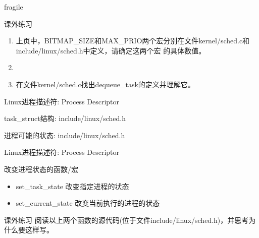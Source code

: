 \documentclass[xcolor=svgnames]{beamer}
\begin{document}
\begin{CJK*}{UTF8}{gbsn}
\begin{frame}{fragile}
\end{frame}

\begin{frame}{课外练习}
\begin{enumerate}
\item 上页中，\alert{BITMAP\_SIZE}和\alert{MAX\_PRIO}两个宏分别在文件kernel/sched.c和include/linux/sched.h中定义，请确定这两个宏
的具体数值。
\item[]
\item 在文件kernel/sched.c找出dequeue\_task的定义并理解它。
\end{enumerate}
\end{frame}

\begin{frame}{Linux进程描述符: Process Descriptor}
\begin{block}{task\_struct结构: include/linux/sched.h}
\lstPCBstate
\end{block}
\begin{block}{进程可能的状态: include/linux/sched.h}
\lststates
\end{block}
\end{frame}

\begin{frame}{Linux进程描述符: Process Descriptor}
\begin{block}{改变进程状态的函数/宏}
\begin{itemize}
\item set\_task\_state 改变指定进程的状态
\item set\_current\_state 改变当前执行的进程的状态
\end{itemize}
\end{block}
\begin{block}{课外练习}
阅读以上两个函数的源代码(位于文件include/linux/sched.h)，并思考为什么要这样写。
\end{block}
\end{frame}

%


\end{CJK*}
\end{document}
